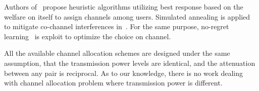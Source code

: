 Authors of~\cite{Ko_DistributedCA} propose heuristic algorithms utilizing best response based on the welfare on itself to assign channels among users.
Simulated annealing is applied to mitigate co-channel interferences in~\cite{SA_CA_TVWS_2012crowncom}.
For the same purpose, no-regret learning~\cite{qlearning_huang, hart00correlatedeq} is exploit to optimize the choice on channel.

All the available channel allocation schemes are designed under the same assumption, that the transmission power levels are identical, and the attenuation between any pair is reciprocal.
As to our knowledge, there is no work dealing with channel allocation problem where transmission power is different.






%
%


